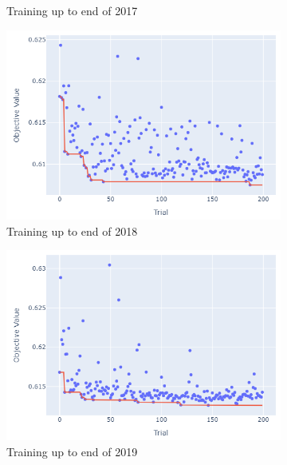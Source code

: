 \documentclass[12pt,twoside]{report}
\begin{document}
\begin{figure}[htb]
\begin{subfigure}{.33\linewidth}
  \caption{Training up to end of 2017}
\end{subfigure}%
\begin{subfigure}{.33\linewidth}
  \centering
  \includegraphics[width=0.95\linewidth]{figures/va_lightgbm_no_odds_cutoff_2018.png}
  \caption{Training up to end of 2018}
\end{subfigure}
\par\bigskip
\par\bigskip
\begin{subfigure}{.33\linewidth}
  \centering
  \includegraphics[width=0.95\linewidth]{figures/va_lightgbm_no_odds_cutoff_2019.png}
  \caption{Training up to end of 2019}
\end{subfigure}%
\begin{subfigure}{.33\linewidth}
  \centering

\end{subfigure}
\end{figure}
\end{document}
